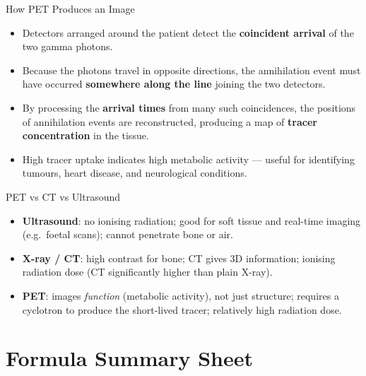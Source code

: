 \begin{keybox}{How PET Produces an Image}
\begin{itemize}[itemsep=3pt]
  \item Detectors arranged around the patient detect the \textbf{coincident arrival} of the two gamma photons.
  \item Because the photons travel in opposite directions, the annihilation event must have occurred \textbf{somewhere along the line} joining the two detectors.
  \item By processing the \textbf{arrival times} from many such coincidences, the positions of annihilation events are reconstructed, producing a map of \textbf{tracer concentration} in the tissue.
  \item High tracer uptake indicates high metabolic activity — useful for identifying tumours, heart disease, and neurological conditions.
\end{itemize}
\end{keybox}

\begin{warningbox}{PET vs CT vs Ultrasound}
\begin{itemize}[itemsep=2pt]
  \item \textbf{Ultrasound}: no ionising radiation; good for soft tissue and real-time imaging (e.g.\ foetal scans); cannot penetrate bone or air.
  \item \textbf{X-ray / CT}: high contrast for bone; CT gives 3D information; ionising radiation dose (CT significantly higher than plain X-ray).
  \item \textbf{PET}: images \emph{function} (metabolic activity), not just structure; requires a cyclotron to produce the short-lived tracer; relatively high radiation dose.
\end{itemize}
\end{warningbox}

\section{Formula Summary Sheet}

